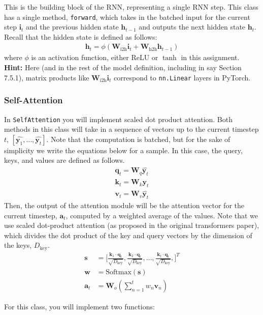 \documentclass[11pt,addpoints,answers]{exam}
\newcommand{\av}{\mathbf{a}}
\newcommand{\hv}{\mathbf{h}}
\newcommand{\iv}{\mathbf{i}}
\newcommand{\kv}{\mathbf{k}}
\newcommand{\qv}{\mathbf{q}}
\newcommand{\sv}{\mathbf{s}}
\newcommand{\vv}{\mathbf{v}}
\newcommand{\wv}{\mathbf{w}}
\newcommand{\yv}{\mathbf{y}}
\newcommand{\Wv}{\mathbf{W}}
\begin{document}
This is the building block of the RNN, representing a single RNN step. This class has a single method, \texttt{forward}, which takes in the batched input for the current step $\iv_t$ and the previous hidden state $\hv_{t-1}$ and outputs the next hidden state $\hv_t$. Recall that the hidden state is defined as follows:
\begin{align*}
    \hv_t = \phi( \Wv_\text{i2h} \iv_t + \Wv_\text{h2h} \hv_{t-1} )
\end{align*}
where $\phi$ is an activation function, either ReLU or $\tanh$ in this assignment.
\textbf{Hint:} Here (and in the rest of the model definition, including in say Section 7.5.1), matrix products like $\Wv_\text{i2h} \iv_t$ correspond to \texttt{nn.Linear} layers in PyTorch.

\subsubsection{Self-Attention}

In \lstinline{SelfAttention} you will implement scaled dot product attention. Both methods in this class will take in a sequence of vectors up to the current timestep $t$, $[\hat{\yv_1}, \ldots, \hat{\yv_t}]$. Note that the computation is batched, but for the sake of simplicity we write the equations below for a sample. In this case, the query, keys, and values are defined as follows.
\begin{align*}
\qv_t = \Wv_q \hat{\yv_t} \\
\kv_t = \Wv_k \hat{\yv_t}\\
\vv_t = \Wv_v \hat{\yv_t}
\end{align*}
Then, the output of the attention module will be the attention vector for the current timestep, $\av_t$, computed by a weighted average of the values. Note that we use scaled dot-product attention (as proposed in the original transformers paper), which divides the dot product of the key and query vectors by the dimension of the keys, $D_\text{key}$.
\begin{align*}
    \sv &= \bigg[ \frac{\kv_1 \cdot \qv_t}{\sqrt{D_\text{key}}}, \frac{\kv_2 \cdot \qv_t}{\sqrt{D_\text{key}}}, \ldots, \frac{\kv_t \cdot \qv_t}{\sqrt{D_\text{key}}}, \bigg]^T \tag{Attention Scores} \\
    \wv &= \text{Softmax}(\sv) \tag{Attention Weights} \\
    \av_t &= \Wv_o \left(\sum_{n=1}^t w_n \vv_n\right)
\end{align*}

For this class, you will implement two functions:
\end{document}
